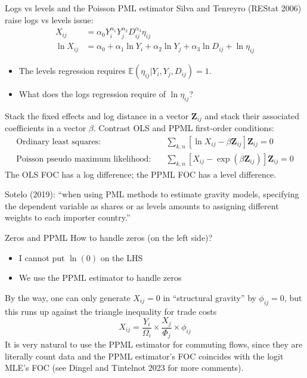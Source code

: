 \documentclass[10pt,notes=hide,aspectratio=169]{beamer}
\begin{document}
\begin{frame}{Logs vs levels and the Poisson PML estimator}
Silva and Tenreyro (REStat 2006) raise logs vs levels issue:
\begin{align*}
X_{ij} &= \alpha_0 Y_i^{\alpha_1}  Y_j^{\alpha_2}  D_{ij}^{\alpha_3} \eta_{ij}
\\
\ln X_{ij} &= \alpha_0 +{\alpha_1} \ln  Y_i   +{\alpha_2}\ln  Y_j +{\alpha_3} \ln D_{ij} + \ln \eta_{ij}
\end{align*}
\vspace{-8mm}
\begin{itemize}
	\item The levels regression requires $\mathbb{E}\left(\eta_{ij}|Y_i,Y_j,D_{ij}\right)=1$.
	\item What does the logs regression require of $\ln \eta_{ij}$?
\end{itemize}
\smallskip \pause
Stack the fixed effects and log distance in a vector $\mathbf{Z}_{ij}$
and
stack their associated coefficients in a vector $\beta$.
Contrast OLS and PPML first-order conditions:
\begin{align*}
  \text{Ordinary least squares:} \quad
  &
  \sum_{k,n} \left[\ln X_{ij} - \beta \mathbf{Z}_{ij} \right] \mathbf{Z}_{ij}= 0
  \\
  \text{Poisson pseudo maximum likelihood:} \quad
  &
  \sum_{k,n} \left[X_{ij} - \exp\left(\beta \mathbf{Z}_{ij}\right)\right] \mathbf{Z}_{ij}= 0
\end{align*}
The OLS FOC has a log difference; the PPML FOC has a level difference.
{Sotelo (2019): ``when using PML methods to estimate gravity models, specifying the dependent variable as shares or as levels amounts to assigning different weights to each importer country.''\par}
\end{frame}
\begin{frame}{Zeros and PPML}
How to handle zeros (on the left side)?
\begin{itemize}
	\item I cannot put $\ln(0)$ on the LHS
	\item We use the PPML estimator to handle zeros
\end{itemize}
\medskip
By the way, one can only generate $X_{ij}=0$ in ``structural gravity'' by $\phi_{ij} = 0$, but this runs up against the triangle inequality for trade costs
\begin{equation*}
X_{ij} = {\frac{Y_i}{\Omega_i}} \times {\frac{X_j}{\Phi_j}} \times \phi_{ij}
\end{equation*}
\medskip
It is very natural to use the PPML estimator for commuting flows,
since they are literally count data and the PPML estimator's FOC coincides with the logit MLE's FOC
(see Dingel and Tintelnot 2023 for more comments).
\end{frame}
\end{document}
